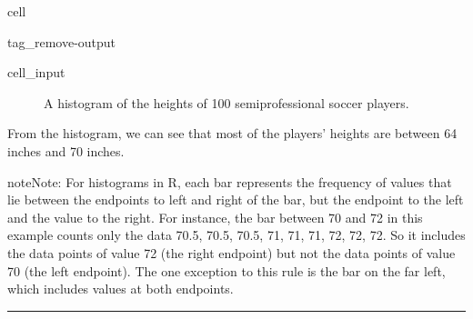 \documentclass[letterpaper,10pt,english]{jupyterBook}
\begin{document}
\begin{sphinxuseclass}{cell}
\begin{sphinxuseclass}{tag_remove-output}
\begin{sphinxVerbatimInput}
\begin{sphinxuseclass}{cell_input}
\begin{sphinxVerbatim}[commandchars=\\\{\}]
}\PYG{l+m}{69.5}\PYG{p}{,}\PYG{+w}{ }\PYG{l+m}{70}\PYG{p}{,}\PYG{+w}{ }\PYG{l+m}{70}\PYG{p}{,}\PYG{+w}{ }\PYG{l+m}{70}\PYG{p}{,}\PYG{+w}{ }\PYG{l+m}{70}\PYG{p}{,}\PYG{+w}{ }\PYG{l+m}{70}\PYG{p}{,}\PYG{+w}{ }\PYG{l+m}{70}\PYG{p}{,}\PYG{+w}{ }\PYG{l+m}{70.5}\PYG{p}{,}\PYG{+w}{ }\PYG{l+m}{70.5}\PYG{p}{,}\PYG{+w}{ }\PYG{l+m}{70.5}\PYG{p}{,}\PYG{+w}{ }\PYG{l+m}{71}\PYG{p}{,}\PYG{+w}{ }\PYG{l+m}{71}\PYG{p}{,}\PYG{+w}{ }\PYG{l+m}{71}\PYG{p}{,}\PYG{+w}{ }\PYG{l+m}{72}\PYG{p}{,}\PYG{+w}{ }\PYG{l+m}{72}\PYG{p}{,}\PYG{+w}{ }\PYG{l+m}{72}\PYG{p}{,}\PYG{+w}{ }\PYG{l+m}{72.5}\PYG{p}{,}\PYG{+w}{ }\PYG{l+m}{72.5}\PYG{p}{,}\PYG{+w}{ }\PYG{l+m}{73}\PYG{p}{,}\PYG{+w}{ }\PYG{l+m}{73.5}\PYG{p}{,}\PYG{+w}{ }\PYG{l+m}{74}\PYG{p}{)}

\PYG{n+nf}{hist}\PYG{p}{(}\PYG{n}{data}\PYG{p}{)}
\end{sphinxVerbatim}

\end{sphinxuseclass}\end{sphinxVerbatimInput}

\end{sphinxuseclass}
\end{sphinxuseclass}
\begin{figure}[htbp]
\centering
\capstart

\noindent{}
\caption{A histogram of the heights of 100 semiprofessional soccer players.}\label{\detokenize{Ch1 Sampling and Data/1.4 Tables and Charts:soccer-hist}}\end{figure}

\sphinxAtStartPar
From the histogram, we can see that most of the players’ heights are between 64 inches and 70 inches.

\begin{sphinxadmonition}{note}{Note:}
\sphinxAtStartPar
For histograms in R, each bar represents the frequency of values that lie between the endpoints to left and right of the bar, but  the endpoint to the left and  the value to the right. For instance, the bar between 70 and 72 in this example counts only the data 70.5, 70.5, 70.5, 71, 71, 71, 72, 72, 72. So it includes the data points of value 72 (the right endpoint) but not the data points of value 70 (the left endpoint). The one exception to this rule is the bar on the far left, which includes values at both endpoints.
\end{sphinxadmonition}


\bigskip\hrule\bigskip
\end{document}
